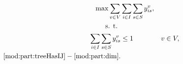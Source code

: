 \begin{subequations}\label{mod:genmatch}
\begin{align}
\notag \max\sum\limits_{v\in V}&\sum\limits_{i\in I}\sum\limits_{s\in S}   y_{is}^v,\\
\notag \text{s. t. } \\
\label{mod:genmatch:nodeBelongs} \sum\limits_{i\in I}\sum\limits_{s\in S}y^v_{is} & \leq 1 & v\in V,\\
\notag\eqref{mod:part:treeHasIJ} - \eqref{mod:part:dim}.
\end{align}~
\end{subequations}



